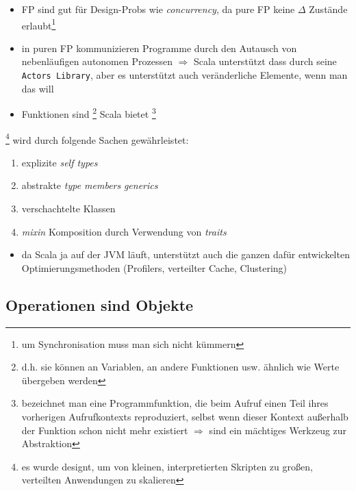 

\begin{itemize}
  \item FP sind gut für Design-Probs wie \textit{concurrency}, da pure FP
  keine $\Delta$ Zustände erlaubt\footnote{um Synchronisation muss man
  sich nicht kümmern}
  \item in puren FP kommunizieren Programme durch den Autausch von
  nebenläufigen autonomen Prozessen $\Rightarrow$ Scala unterstützt dass
  durch seine \texttt{Actors Library}, aber es unterstützt auch
  veränderliche Elemente, wenn man das will
  \item Funktionen sind \footnote{d.h. sie können 
  an Variablen, an andere Funktionen usw. ähnlich wie Werte übergeben werden}
  \und Scala bietet \footnote{bezeichnet man 
  eine Programmfunktion, die beim Aufruf einen Teil ihres vorherigen
  Aufrufkontexts reproduziert, selbst wenn dieser Kontext außerhalb der 
  Funktion schon nicht mehr existiert $\Rightarrow$ sind ein mächtiges 
  Werkzeug zur Abstraktion} 
\end{itemize}


\footnote{es wurde designt, um von kleinen, interpretierten
Skripten zu großen, verteilten Anwendungen zu skalieren} wird durch folgende
Sachen gewährleistet:


\begin{enumerate}
  \item explizite \textit{self types}
  \item abstrakte \textit{type members} \und \textit{generics}
  \item verschachtelte Klassen
  \item \textit{mixin} Komposition durch Verwendung von \textit{traits}
\end{enumerate}




\begin{itemize}
  \item da Scala ja auf der JVM läuft, unterstützt auch die ganzen dafür
  entwickelten Optimierungsmethoden (Profilers, verteilter Cache, Clustering)
\end{itemize}


\subsection{Operationen sind Objekte}


